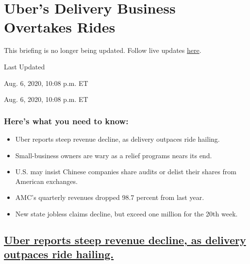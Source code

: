 \hypertarget{ubers-delivery-business-overtakes-rides}{%
\section{Uber's Delivery Business Overtakes
Rides}\label{ubers-delivery-business-overtakes-rides}}

This briefing is no longer being updated. Follow live updates
\href{https://www.nytimes3xbfgragh.onion/2020/08/06/world/coronavirus-covid.html}{here}.

Last Updated

Aug. 6, 2020, 10:08 p.m. ET

Aug. 6, 2020, 10:08 p.m. ET

\hypertarget{heres-what-you-need-to-know}{%
\subsubsection{Here's what you need to
know:}\label{heres-what-you-need-to-know}}

\begin{itemize}
\item
  \protect\hyperlink{uber-reports-steep-revenue-decline-as-delivery-outpaces-ride-hailing}{}

  Uber reports steep revenue decline, as delivery outpaces ride hailing.
\item
  \protect\hyperlink{small-business-owners-are-wary-as-a-relief-programs-nears-its-end}{}

  Small-business owners are wary as a relief programs nears its end.
\item
  \protect\hyperlink{us-may-insist-chinese-companies-share-audits-or-delist-their-shares-from-american-exchanges}{}

  U.S. may insist Chinese companies share audits or delist their shares
  from American exchanges.
\item
  \protect\hyperlink{amcs-quarterly-revenues-dropped-98-7-percent-from-last-year}{}

  AMC's quarterly revenues dropped 98.7 percent from last year.
\item
  \protect\hyperlink{new-state-jobless-claims-decline-but-exceed-one-million-for-the-20th-week}{}

  New state jobless claims decline, but exceed one million for the 20th
  week.
\end{itemize}

\hypertarget{uber-reports-steep-revenue-decline-as-delivery-outpaces-ride-hailing}{%
\subsection{\texorpdfstring{\protect\hyperlink{uber-reports-steep-revenue-decline-as-delivery-outpaces-ride-hailing}{Uber
reports steep revenue decline, as delivery outpaces ride
hailing.}}{Uber reports steep revenue decline, as delivery outpaces ride hailing.}}\label{uber-reports-steep-revenue-decline-as-delivery-outpaces-ride-hailing}}

